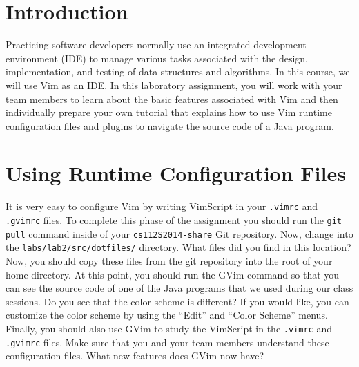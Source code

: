 


\usepackage[compact]{titlesec}



\section*{Introduction}

Practicing software developers normally use an integrated development environment (IDE) to manage various tasks associated with the
design, implementation, and testing of data structures and algorithms. In this course, we will use Vim as an IDE.  In this laboratory
assignment, you will work with your team members to learn about the basic features associated with Vim and then individually
prepare your own tutorial that explains how to use Vim runtime configuration files and plugins to navigate the source code of a
Java program.  

\section*{Using Runtime Configuration Files}

It is very easy to configure Vim by writing VimScript in your {\tt .vimrc} and {\tt .gvimrc} files.  To complete this phase of the
assignment you should run the {\tt git pull} command inside of your {\tt cs112S2014-share} Git repository.  Now, change into the
{\tt labs/lab2/src/dotfiles/} directory.  What files did you find in this location? Now, you should copy these files from the git
repository into the root of your home directory. At this point, you should run the GVim command so that you can see the source
code of one of the Java programs that we used during our class sessions. Do you see that the color scheme is different? If you
would like, you can customize the color scheme by using the ``Edit'' and ``Color Scheme'' menus.  Finally, you should also use
GVim to study the VimScript in the {\tt .vimrc} and {\tt .gvimrc} files.  Make sure that you and your team members understand
these configuration files. What new features does GVim now have?


